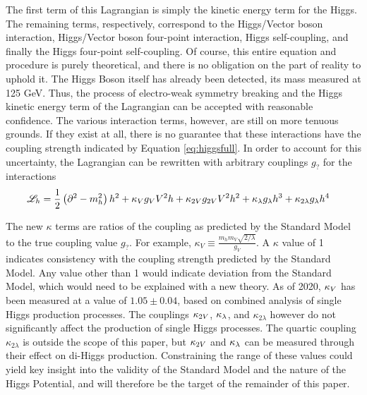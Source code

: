     The first term of this Lagrangian is simply the kinetic energy term for the Higgs.
    The remaining terms, respectively,
        correspond to the Higgs/Vector boson interaction,
        Higgs/Vector boson four-point interaction,
        Higgs self-coupling,
        and finally the Higgs four-point self-coupling.
    Of course, this entire equation and procedure is purely theoretical, and there is no obligation on the part of reality to uphold it.
    The Higgs Boson itself has already been detected, its mass measured at 125 GeV.
    Thus, the process of electro-weak symmetry breaking and the Higgs kinetic energy term of the Lagrangian can be accepted with reasonable confidence.
    The various interaction terms, however, are still on more tenuous grounds.
    If they exist at all, there is no guarantee that these interactions have the coupling strength indicated by Equation \ref{eq:higgsfull}.
    In order to account for this uncertainty, the Lagrangian can be rewritten with arbitrary couplings $g_?$ for the interactions
    \begin{equation} \begin{split} \label{eq:higgskappas}
        \mathscr{L}_h &= \frac{1}{2} \left(\partial^2 - m_h^2 \right) h^2
            + \kappa_{V} g_V V^2 h + \kappa_{2V} g_{2V} V^2 h^2
            + \kappa_{\lambda} g_{\lambda} h^3 + \kappa_{2 \lambda} g_{\lambda} h^4
    \end{split} \end{equation}

    The new $\kappa$ terms are ratios of the coupling as predicted by the Standard Model to the true coupling value $g_?$.
    For example, $\kappa_V \equiv \frac{m_h m_V \sqrt{2/\lambda}}{g_V}$.
    A $\kappa$ value of 1 indicates consistency with the coupling strength predicted by the Standard Model.
    Any value other than 1 would indicate deviation from the Standard Model, which would need to be explained with a new theory.
    As of 2020, $\kappa_{V}$ has been measured at a value of $1.05 \pm 0.04$,
        based on combined analysis of single Higgs production processes\cite{paper:higgs_combined}.
    The couplings $\kappa_{2V}$, $\kappa_{\lambda}$, and $\kappa_{2\lambda}$ however do not significantly affect the production of single Higgs processes.
    The quartic coupling $\kappa_{2\lambda}$ is outside the scope of this paper,
        but $\kappa_{2V}$ and $\kappa_{\lambda}$ can be measured through their effect on di-Higgs production.
    Constraining the range of these values could yield key insight into the validity of the Standard Model and the nature of the Higgs Potential,
        and will therefore be the target of the remainder of this paper.
